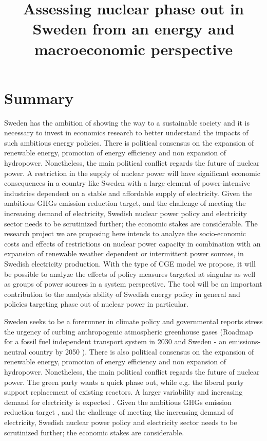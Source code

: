 


\title{Assessing nuclear phase out in Sweden from an energy and macroeconomic perspective}
\maketitle
\author{}
\date{}
\section{Summary}
Sweden has the ambition of showing the way to a sustainable society and it is necessary to invest in economics research to better understand the impacts of such ambitious energy policies. There is political consensus on the expansion of renewable energy, promotion of energy efficiency and non expansion of hydropower. Nonetheless, the main political conflict regards the future of nuclear power. A restriction in the supply of nuclear power will have significant economic consequences in a country like Sweden with a large element of power-intensive industries dependent on a stable and affordable supply of electricity. Given the ambitious GHGs emission reduction target, and the challenge of meeting the increasing demand of electricity, Swedish nuclear power policy and electricity sector needs to be scrutinized further; the economic stakes are considerable. The research project we are proposing here intends to analyze the socio-economic costs and effects of restrictions on nuclear power capacity in combination with an expansion of renewable weather dependent or intermittent power sources, in Swedish electricity production. With the type of CGE model we propose, it will be possible to analyze the effects of policy measures targeted at singular as well as groups of power sources in a system perspective. The tool will be an important contribution to the analysis ability of Swedish energy policy in general and policies targeting phase out of nuclear power in particular.

Sweden seeks to be a forerunner in climate policy and governmental reports stress the urgency of curbing anthropogenic atmospheric greenhouse gases (Roadmap for a fossil fuel independent transport system in 2030 \cite{SOU201384} and Sweden - an emissions-neutral country by 2050 \cite{sepa2012}). There is also political consensus on the expansion of renewable energy, promotion of energy efficiency and non expansion of hydropower. Nonetheless, the main political conflict regards the future of nuclear power. The green party wants a quick phase out, while e.g. the liberal party support replacement of existing reactors. A larger variability and increasing demand for electricity is expected \cite{sepa2012, SOU201384}. Given the ambitious GHGs emission reduction target \cite{SOU201384}, and the challenge of meeting the increasing demand of electricity, Swedish nuclear power policy and electricity sector needs to be scrutinized further; the economic stakes are considerable.


